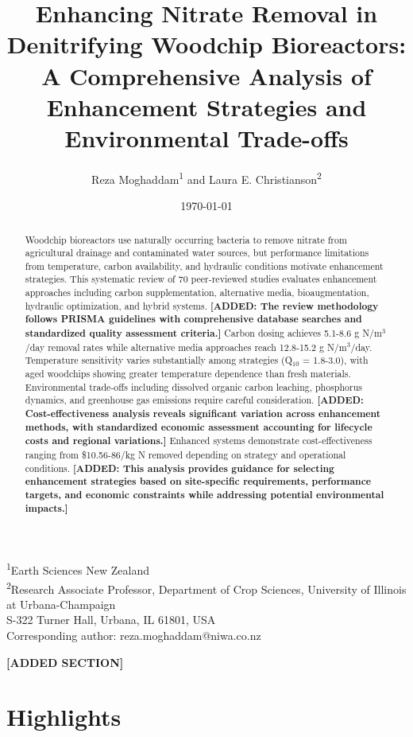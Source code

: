 \documentclass[12pt,a4paper]{article}
\title{Enhancing Nitrate Removal in Denitrifying Woodchip Bioreactors: A Comprehensive Analysis of Enhancement Strategies and Environmental Trade-offs \added{- Revised Manuscript}}
\author{Reza Moghaddam\textsuperscript{1} and Laura E. Christianson\textsuperscript{2}}
\date{\today}
\newcommand{\added}[1]{\textcolor{addedtext}{\textbf{[ADDED: #1]}}}
\begin{document}
\maketitle

\begin{center}
\footnotesize
\textsuperscript{1}Earth Sciences New Zealand\\
\textsuperscript{2}Research Associate Professor, Department of Crop Sciences, University of Illinois at Urbana-Champaign\\
S-322 Turner Hall, Urbana, IL 61801, USA\\
Corresponding author: reza.moghaddam@niwa.co.nz
\end{center}

\begin{abstract}
Woodchip bioreactors use naturally occurring bacteria to remove nitrate from agricultural drainage and contaminated water sources, but performance limitations from temperature, carbon availability, and hydraulic conditions motivate enhancement strategies. This systematic review of 70 peer-reviewed studies evaluates enhancement approaches including carbon supplementation, alternative media, bioaugmentation, hydraulic optimization, and hybrid systems. \added{The review methodology follows PRISMA guidelines with comprehensive database searches and standardized quality assessment criteria.} Carbon dosing achieves 5.1-8.6 g N/m$^3$/day removal rates while alternative media approaches reach 12.8-15.2 g N/m$^3$/day. Temperature sensitivity varies substantially among strategies (Q$_{10}$ = 1.8-3.0), with aged woodchips showing greater temperature dependence than fresh materials. Environmental trade-offs including dissolved organic carbon leaching, phosphorus dynamics, and greenhouse gas emissions require careful consideration. \added{Cost-effectiveness analysis reveals significant variation across enhancement methods, with standardized economic assessment accounting for lifecycle costs and regional variations.} Enhanced systems demonstrate cost-effectiveness ranging from \$10.56-86/kg N removed depending on strategy and operational conditions. \added{This analysis provides guidance for selecting enhancement strategies based on site-specific requirements, performance targets, and economic constraints while addressing potential environmental impacts.}
\end{abstract}

\textcolor{addedtext}{\textbf{[ADDED SECTION]}}
\section*{Highlights}
\end{document}
